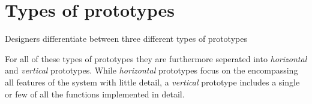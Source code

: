 \section{Types of prototypes} \label{sec:types_of_prototypes}
Designers differentiate between three different types of prototypes





\noindent For all of these types of prototypes they are furthermore seperated into \emph{horizontal} and \emph{vertical} prototypes. While \emph{horizontal} prototypes focus on the encompassing all features of the system with little detail, a \emph{vertical} prototype includes a single or few of all the functions implemented in detail. \cite[p. 179]{benyon14}
 

